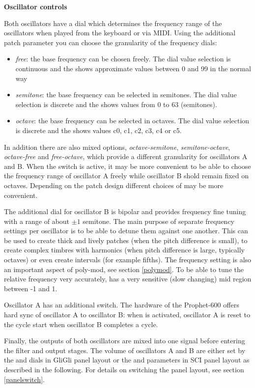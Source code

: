 \textbf{Oscillator controls}

Both oscillators have a \oscfreq dial which determines the frequency range of the oscillators when played from the keyboard or via MIDI. Using the additional patch parameter \oscpitchmode you can choose the granularity of the frequency dials: 
\begin{itemize}
  \item \textit{free}: the base frequency can be chosen freely. The dial value selection is continuous and the \display shows approximate values between 0 and 99 in the normal way
  \item \textit{semitone}: the base frequency can be selected in semitones. The dial value selection is discrete and the \display shows values from 0 to 63 (semitones).   
  \item \textit{octave}: the base frequency can be selected in octaves. The dial value selection is discrete and the \display shows values c0, c1, c2, c3, c4 or c5. 
\end{itemize}  
In addition there are also mixed options, \textit{octave-semitone}, \textit{semitone-octave}, \textit{octave-free} and \textit{free-octave}, which provide a different granularity for oscillators A and B. When the \oscsync switch is active, it may be more convenient to be able to choose the frequency range of oscillator A freely while oscillator B shold remain fixed on octaves. Depending on the patch design different choices of \oscpitchmode may be more convenient. 

The additional \freqfine dial for oscillator B is bipolar and provides frequency fine tuning with a range of about $\pm 1$ semitone. The main purpose of separate frequency settings per oscillator is to be able to detune them against one another. This can be used to create thick and lively patches (when the pitch difference is small), to create complex timbres with harmonics (when pitch difference is large, typically octaves) or even create intervals (for example fifths). The frequency setting is also an important aspect of poly-mod, see section \ref{polymod}. To be able to tune the relative frequency very accurately, \freqfine has a very sensitive (slow changing) mid region between -1 and 1.

Oscillator A has an additional \oscsync switch. The hardware of the Prophet-600 offers hard sync of oscillator A to oscillator B: when \oscsync is activated, oscillator A is reset to the cycle start when oscillator B completes a cycle. 

Finally, the outputs of both oscillators are mixed into one signal before entering the filter and output stages. The volume of oscillators A and B are either set by the \vola and \volb dials in GliGli panel layout or the \mixer and \drive parameters in SCI panel layout as described in the following. For details on switching the panel layout, see section \ref{panelswitch}.

